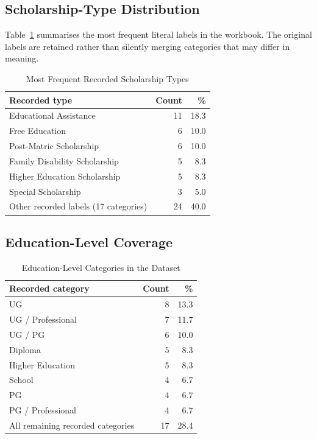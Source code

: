 \documentclass[conference]{IEEEtran}
\begin{document}
\subsection{Scholarship-Type Distribution}
Table~\ref{tab:type} summarises the most frequent literal labels in the workbook. The original labels are retained rather than silently merging categories that may differ in meaning.
\begin{table}[!t]
\caption{Most Frequent Recorded Scholarship Types}
\label{tab:type}
\centering
\small
\begin{tabular}{p{}rr}
\toprule
\textbf{Recorded type} & \textbf{Count} & \textbf{\%}\\
\midrule
Educational Assistance & 11 & 18.3\\
Free Education & 6 & 10.0\\
Post-Matric Scholarship & 6 & 10.0\\
Family Disability Scholarship & 5 & 8.3\\
Higher Education Scholarship & 5 & 8.3\\
Special Scholarship & 3 & 5.0\\
Other recorded labels (17 categories) & 24 & 40.0\\
\bottomrule
\end{tabular}
\end{table}

\subsection{Education-Level Coverage}
\begin{table}[!t]
\caption{Education-Level Categories in the Dataset}
\label{tab:education}
\centering
\small
\begin{tabular}{p{}rr}
\toprule
\textbf{Recorded category} & \textbf{Count} & \textbf{\%}\\
\midrule
UG & 8 & 13.3\\
UG / Professional & 7 & 11.7\\
UG / PG & 6 & 10.0\\
Diploma & 5 & 8.3\\
Higher Education & 5 & 8.3\\
School & 4 & 6.7\\
PG & 4 & 6.7\\
PG / Professional & 4 & 6.7\\
All remaining recorded categories & 17 & 28.4\\
\bottomrule
\end{tabular}
\end{table}
\end{document}
